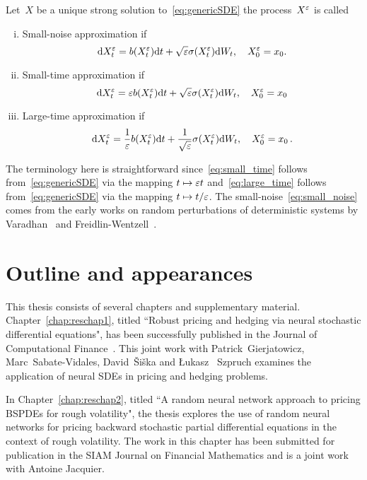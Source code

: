 \begin{definition}\label{def:LDP_approximation_types}
Let~$X$ be a unique strong solution to~\eqref{eq:genericSDE} the process~$X^\varepsilon$ is called
\begin{enumerate}[i)]
\item Small-noise approximation if 
\begin{equation}\label{eq:small_noise}
\mathrm{d} X_t^\varepsilon = b(X_t^\varepsilon) \mathrm{d} t + \sqrt{\varepsilon} \sigma(X_t^\varepsilon)\mathrm{d} W_t, \quad X_0^\varepsilon = x_0.
\end{equation}
\item Small-time approximation if 
\begin{equation}\label{eq:small_time}
\mathrm{d} X_t^\varepsilon = \varepsilon b(X_t^\varepsilon) \mathrm{d} t + \sqrt{\varepsilon} \sigma(X_t^\varepsilon) \mathrm{d} W_t, \quad X_0^\varepsilon = x_0
\end{equation}
\item Large-time approximation if 
\begin{equation}\label{eq:large_time}
\mathrm{d} X_t^\varepsilon = \frac{1}{\varepsilon} b(X_t^\varepsilon) \mathrm{d} t + \frac{1}{\sqrt{\varepsilon}} \sigma(X_t^\varepsilon) \mathrm{d} W_t, \quad X_0^\varepsilon = x_0\,.
\end{equation}
\end{enumerate}
\end{definition}
The terminology here is straightforward since~\eqref{eq:small_time} follows from~\eqref{eq:genericSDE} via the mapping $t \mapsto \varepsilon t$
and~\eqref{eq:large_time} follows from~\eqref{eq:genericSDE} via the mapping
$t\mapsto t/\varepsilon$.
The small-noise~\eqref{eq:small_noise}
comes from the early works 
on random perturbations of deterministic systems by Varadhan~\cite{Varadhan1967DiffusionInterval} and Freidlin-Wentzell~\cite{Freidlin2012RandomSystems}.


\section{Outline and appearances}

This thesis consists of several chapters and supplementary material. Chapter~\ref{chap:reschap1}, titled ``Robust pricing and hedging via neural stochastic differential equations", has been successfully published in the Journal of Computational Finance~\cite{Gierjatowicz2023RobustEquations}. This joint work with Patrick~Gierjatowicz, Marc~Sabate-Vidales, David~Šiška and \L{}ukasz ~Szpruch examines the application of neural SDEs in pricing and hedging problems. 

In Chapter~\ref{chap:reschap2}, titled ``A random neural network approach to pricing BSPDEs for rough volatility", the thesis explores the use of random neural networks for pricing backward stochastic partial differential equations in the context of rough volatility. The work in this chapter has been submitted for publication in the SIAM Journal on Financial Mathematics and is a joint work with Antoine Jacquier.

